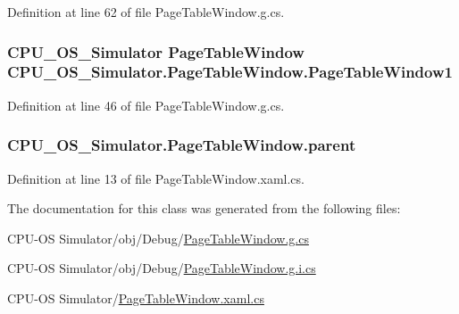 Definition at line 62 of file Page\+Table\+Window.\+g.\+cs.

\hypertarget{class_c_p_u___o_s___simulator_1_1_page_table_window_ac72a468cc382de9caf8ccac13b35d755}{}
\subsubsection[{Page\+Table\+Window1}]{\setlength{\rightskip}{0pt plus 5cm}C\+P\+U\+\_\+\+O\+S\+\_\+\+Simulator {\bf Page\+Table\+Window} C\+P\+U\+\_\+\+O\+S\+\_\+\+Simulator.\+Page\+Table\+Window.\+Page\+Table\+Window1\hspace{0.3cm}{\ttfamily [package]}}\label{class_c_p_u___o_s___simulator_1_1_page_table_window_ac72a468cc382de9caf8ccac13b35d755}


Definition at line 46 of file Page\+Table\+Window.\+g.\+cs.

\hypertarget{class_c_p_u___o_s___simulator_1_1_page_table_window_a1903e0b83820829549f74207cd209337}{}
\subsubsection[{parent}]{ C\+P\+U\+\_\+\+O\+S\+\_\+\+Simulator.\+Page\+Table\+Window.\+parent\hspace{0.3cm}{\ttfamily [private]}}\label{class_c_p_u___o_s___simulator_1_1_page_table_window_a1903e0b83820829549f74207cd209337}


Definition at line 13 of file Page\+Table\+Window.\+xaml.\+cs.



The documentation for this class was generated from the following files\+:\begin{DoxyCompactItemize}
\item 
C\+P\+U-\/\+O\+S Simulator/obj/\+Debug/\hyperlink{_page_table_window_8g_8cs}{Page\+Table\+Window.\+g.\+cs}\item 
C\+P\+U-\/\+O\+S Simulator/obj/\+Debug/\hyperlink{_page_table_window_8g_8i_8cs}{Page\+Table\+Window.\+g.\+i.\+cs}\item 
C\+P\+U-\/\+O\+S Simulator/\hyperlink{_page_table_window_8xaml_8cs}{Page\+Table\+Window.\+xaml.\+cs}\end{DoxyCompactItemize}
